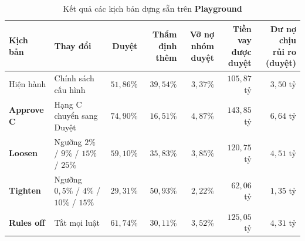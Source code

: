\begin{table}[H]
	\centering
	\caption{Kết quả các kịch bản dựng sẵn trên \textbf{Playground}}
	\label{tab:playground-presets}
	\footnotesize
	\begin{tabular}{p{} p{} r r r r r}
		\toprule
		\textbf{Kịch bản}  & \textbf{Thay đổi}                          & \textbf{Duyệt} & \makecell[r]{\textbf{Thẩm định}\\\textbf{thêm}} & \makecell[r]{\textbf{Vỡ nợ}\\\textbf{nhóm duyệt}} & \makecell[r]{\textbf{Tiền vay}\\\textbf{được duyệt}} & \makecell[r]{\textbf{Dư nợ chịu}\\\textbf{rủi ro (duyệt)}} \\
		\midrule
		Hiện hành          & Chính sách cấu hình                        & $51{,}86\%$    & $39{,}54\%$                                     & $3{,}37\%$                                        & $105{,}87$ tỷ                                        & $3{,}50$ tỷ                                                \\
		\textbf{Approve C} & Hạng C chuyển sang Duyệt                   & $74{,}90\%$    & $16{,}51\%$                                     & $4{,}87\%$                                        & $143{,}85$ tỷ                                        & $6{,}64$ tỷ                                                \\
		\textbf{Loosen}    & Ngưỡng $2\%$ / $9\%$ / $15\%$ / $25\%$     & $59{,}10\%$    & $35{,}83\%$                                     & $3{,}85\%$                                        & $120{,}75$ tỷ                                        & $4{,}51$ tỷ                                                \\
		\textbf{Tighten}   & Ngưỡng $0{,}5\%$ / $4\%$ / $10\%$ / $15\%$ & $29{,}31\%$    & $50{,}93\%$                                     & $2{,}22\%$                                        & $62{,}06$ tỷ                                         & $1{,}35$ tỷ                                                \\
		\textbf{Rules off} & Tắt mọi luật                               & $61{,}74\%$    & $30{,}11\%$                                     & $3{,}52\%$                                        & $125{,}05$ tỷ                                        & $4{,}31$ tỷ                                                \\
		\bottomrule
	\end{tabular}
\end{table}

